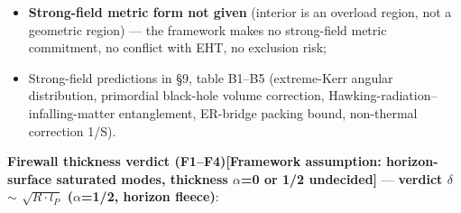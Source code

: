 \documentclass[12pt]{article}
\newcommand{\mtag}[1]{\textbf{[#1]}}
\newcommand{\down}[1]{\ensuremath{_{#1}}}
\begin{document}
\begin{itemize}
\item \textbf{Strong-field metric form not given} (interior is an overload region, not a geometric region) --- the framework makes no strong-field metric commitment, no conflict with EHT, no exclusion risk;
\item Strong-field predictions in \S{}9, table B1--B5 (extreme-Kerr angular distribution, primordial black-hole volume correction, Hawking-radiation--infalling-matter entanglement, ER-bridge packing bound, non-thermal correction 1/S).
\end{itemize}

\textbf{Firewall thickness verdict (F1--F4)}\mtag{Framework assumption: horizon-surface saturated modes, thickness \ensuremath{\alpha}=0 or 1/2 undecided} --- \textbf{verdict \ensuremath{\delta} \ensuremath{\sim} \ensuremath{\sqrt{R\cdot{}l\down{P}}} (\ensuremath{\alpha}=1/2, horizon fleece)}:
\end{document}

